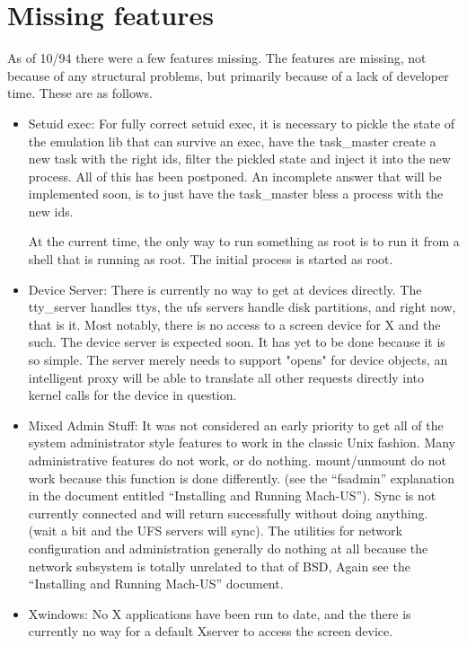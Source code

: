 \section{Missing features}
As of 10/94 there were a few features missing.  The features are missing,
not because of any structural problems, but primarily because of a lack of
developer time.  These are as follows.
\begin{itemize}
\item{Setuid exec}:
For fully correct setuid exec, it is necessary to pickle the state of
the emulation lib that can survive an exec, have the task\_master create
a new task with the right ids, filter the pickled state and inject it into
the new process.  All of this has been postponed.  An incomplete answer
that will be implemented soon, is to just have the task\_master bless a process
with the new ids.

At the current time, the only way to run something as root is to run it from a
shell that is running as root.  The initial process is started as root.

\item{Device Server}:
There is currently no way to get at devices directly.  The tty\_server handles
ttys, the ufs servers handle disk partitions, and right now, that is it.
Most notably, there is no access to a screen device for X and the such.
The device server is expected soon.  It has yet to be done because it is so
simple.  The server merely needs to support "opens" for device objects,
an intelligent proxy will be able to translate all other requests directly into
kernel calls for the device in question.

\item{Mixed Admin Stuff}:
It was not considered an early priority to get all of the system administrator
style features to work in the classic Unix fashion.
Many administrative features do not work, or do nothing.  mount/unmount
do not work because this function is done differently.
(see the ``fsadmin'' explanation in the
document entitled ``Installing and Running Mach-US'').
Sync is not currently connected and
will return successfully without doing anything.
(wait a bit and the UFS servers
will sync).  The utilities for network configuration and administration
generally do nothing at all because the network subsystem is totally unrelated
to that of BSD,  Again see the ``Installing and Running Mach-US'' document.

\item{Xwindows}: No X applications have been run to date, and the there
is currently no way for a default Xserver to access the screen device.
\end{itemize}

